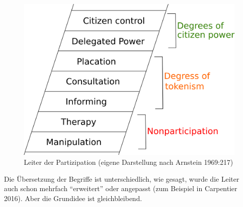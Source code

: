 \documentclass[a4paper,
fontsize=11pt,
oneside,
numbers=noperiodatend,
parskip=half-,
bibliography=totoc,
final
]{scrartcl}
\begin{document}
\begin{figure}
\centering
\includegraphics{img/Ladder-of-Citizen-Participation.jpg}
\caption{Leiter der Partizipation (eigene Darstellung nach Arnstein
1969:217)}
\end{figure}

Die Übersetzung der Begriffe ist unterschiedlich, wie gesagt, wurde die
Leiter auch schon mehrfach \enquote{erweitert} oder angepasst (zum
Beispiel in Carpentier 2016). Aber die Grundidee ist gleichbleibend.
\end{document}
